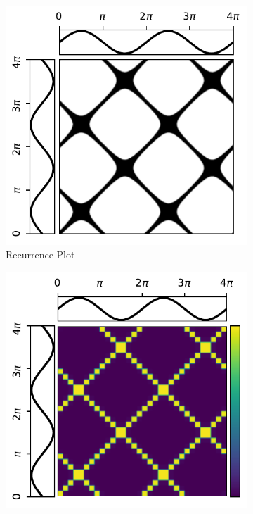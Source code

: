 \begin{figure}[!htb]
    \begin{center}
        \begin{subfigure}[b]{0.315\linewidth}
            \centering
            \includegraphics[width=\linewidth]{figures/imaging_1.pdf}
            \caption{Recurrence Plot}
        \end{subfigure}
        \hfill
        \begin{subfigure}[b]{0.32\linewidth}
            \centering
            \includegraphics[width=\linewidth]{figures/imaging_2.pdf}

\end{subfigure}
\end{center}
\end{figure}
